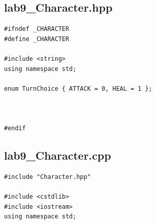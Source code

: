 \documentclass[a4paper,12pt,oneside]{book}
\begin{document}
\subsection*{lab9\_Character.hpp}

\begin{lstlisting}[style=code]
#ifndef _CHARACTER
#define _CHARACTER

#include <string>
using namespace std;

enum TurnChoice { ATTACK = 0, HEAL = 1 };



#endif
\end{lstlisting}

\subsection*{lab9\_Character.cpp}

\begin{lstlisting}[style=code]
#include "Character.hpp"

#include <cstdlib>
#include <iostream>
using namespace std;
\end{lstlisting}
\end{document}
